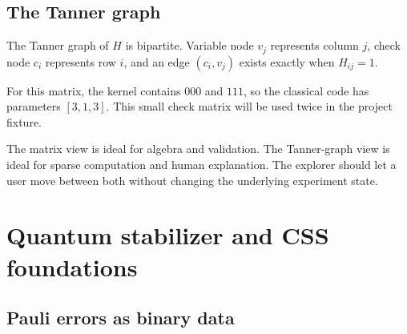 \documentclass[11pt,letterpaper]{article}
\begin{document}
\subsection{The Tanner graph}

The Tanner graph of $H$ is bipartite. Variable node $v_j$ represents column $j$, check node $c_i$
represents row $i$, and an edge $(c_i,v_j)$ exists exactly when $H_{ij}=1$.

\begin{center}
\end{center}

For this matrix, the kernel contains $000$ and $111$, so the classical code has parameters
$[3,1,3]$. This small check matrix will be used twice in the project fixture.

\begin{keyidea}
The matrix view is ideal for algebra and validation. The Tanner-graph view is ideal for sparse
computation and human explanation. The explorer should let a user move between both without
changing the underlying experiment state.
\end{keyidea}

\section{Quantum stabilizer and CSS foundations}

\subsection{Pauli errors as binary data}
\end{document}
